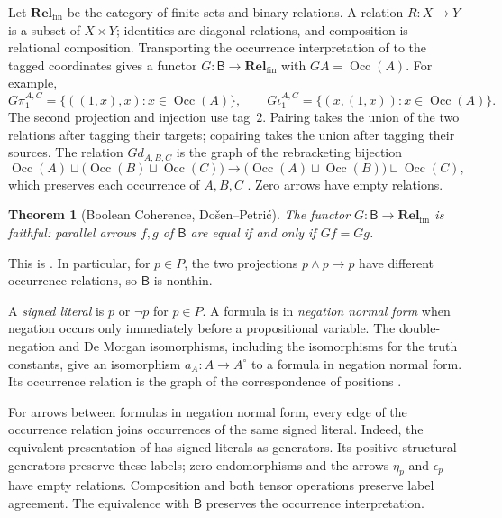 \documentclass[11pt]{article}
\newtheorem{theorem}{Theorem}[section]
\newcommand{\B}{\mathsf B}
\newcommand{\Occ}{\operatorname{Occ}}
\newcommand{\Rel}{\mathbf{Rel}_{\mathrm{fin}}}
\begin{document}
Let $\Rel$ be the category of finite sets and binary relations.
A relation $R:X\to Y$ is a subset of $X\times Y$; identities are
diagonal relations, and composition is relational composition.
Transporting the occurrence interpretation of \cite{DP} to the
tagged coordinates gives a functor
$G:\B\to\Rel$ with $GA=\Occ(A)$.
For example,
\[
 G\pi_1^{A,C}=\{((1,x),x):x\in\Occ(A)\},\qquad
 G\iota_1^{A,C}=\{(x,(1,x)):x\in\Occ(A)\}.
\]
The second projection and injection use tag~$2$. Pairing takes the
union of the two relations after tagging their targets; copairing
takes the union after tagging their sources. The relation $Gd_{A,B,C}$
is the graph of the rebracketing bijection
\[
 \Occ(A)\sqcup\bigl(\Occ(B)\sqcup\Occ(C)\bigr)
 \longrightarrow
 \bigl(\Occ(A)\sqcup\Occ(B)\bigr)\sqcup\Occ(C),
\]
which preserves each occurrence of $A,B,C$
\cite[\S2.9, p.~60]{DP}. Zero arrows have empty relations.

\begin{theorem}[Boolean Coherence, Do\v{s}en--Petri\'c]
\label{thm:coherence}
The functor $G:\B\to\Rel$ is faithful: parallel arrows $f,g$ of
$\B$ are equal if and only if $Gf=Gg$.
\end{theorem}

This is \cite[\S14.2, p.~321]{DP}. In particular, for $p\in P$, the
two projections $p\wedge p\to p$ have different occurrence
relations, so $\B$ is nonthin.

A \emph{signed literal} is $p$ or $\neg p$ for $p\in P$.
A formula is in \emph{negation normal form} when negation occurs only
immediately before a propositional variable. The double-negation and
De Morgan isomorphisms, including the isomorphisms for the truth
constants, give an isomorphism $a_A:A\to A^\circ$ to a formula in
negation normal form. Its occurrence relation is the graph of the
correspondence of positions \cite[\S14.1, pp.~313--315]{DP}.

For arrows between formulas in negation normal form, every edge of
the occurrence relation joins occurrences of the same signed literal.
Indeed, the equivalent presentation of \cite[\S14.2, pp.~318--321]{DP}
has signed literals as generators. Its positive structural generators
preserve these labels; zero endomorphisms and the arrows $\eta_p$ and
$\epsilon_p$ have empty relations. Composition and both tensor
operations preserve label agreement. The equivalence with $\B$ preserves the occurrence
interpretation.
\end{document}
